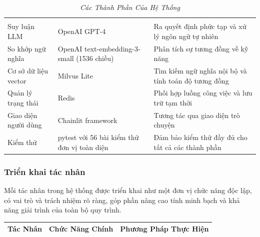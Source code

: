 \documentclass{article}
\begin{document}
\begin{itemize}[topsep=0pt, itemsep=4pt, leftmargin=40pt]
\begin{longtable}{|
  >{\raggedright\arraybackslash}p{}|
  >{\raggedright\arraybackslash}p{}|
  >{\raggedright\arraybackslash}p{}|}
  \endhead

  \hline
  \endfoot

  \hline
  \caption{\textit{Các Thành Phần Của Hệ Thống}} \\
  \endlastfoot

  Suy luận LLM &
  OpenAI GPT-4 &
  Ra quyết định phức tạp và xử lý ngôn ngữ tự nhiên \\
  \hline

  So khớp ngữ nghĩa &
  OpenAI text-embedding-3-small (1536 chiều) &
  Phân tích sự tương đồng về kỹ năng \\
  \hline

  Cơ sở dữ liệu vector &
  Milvus Lite &
  Tìm kiếm ngữ nghĩa nội bộ và tính toán độ tương đồng \\
  \hline

  Quản lý trạng thái &
  Redis &
  Phối hợp luồng công việc và lưu trữ tạm thời \\
  \hline

  Giao diện người dùng &
  Chainlit framework &
  Tương tác qua giao diện trò chuyện \\
  \hline

  Kiểm thử &
  pytest với 56 bài kiểm thử đơn vị toàn diện &
  Đảm bảo kiểm thử đầy đủ cho tất cả các thành phần \\
  \hline
\end{longtable}

\subsubsection{Triển khai tác nhân}

Mỗi tác nhân trong hệ thống được triển khai như một đơn vị chức năng độc lập, có vai trò và trách nhiệm rõ ràng, góp phần nâng cao tính minh bạch và khả năng giải trình của toàn bộ quy trình.

\begin{longtable}{|
  >{\raggedright\arraybackslash}p{}|
  >{\raggedright\arraybackslash}p{}|
  >{\raggedright\arraybackslash}p{}|}
  \hline
  \textbf{Tác Nhân} & 
  \textbf{Chức Năng Chính} & 
  \textbf{Phương Pháp Thực Hiện} \\
  \hline
  \endfirsthead

  \endhead


\end{longtable}
\end{itemize}
\end{document}
